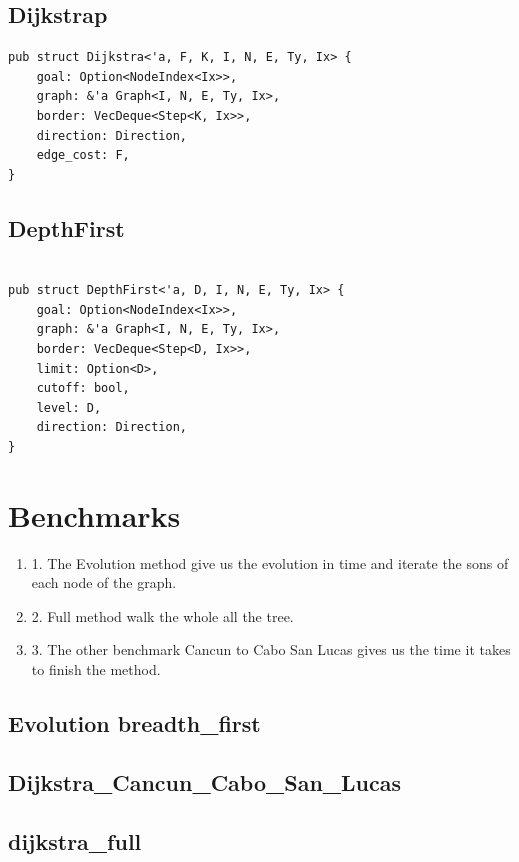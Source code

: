 \subsection{Dijkstrap}
\begin{verbatim}
pub struct Dijkstra<'a, F, K, I, N, E, Ty, Ix> {
    goal: Option<NodeIndex<Ix>>,
    graph: &'a Graph<I, N, E, Ty, Ix>,
    border: VecDeque<Step<K, Ix>>,
    direction: Direction,
    edge_cost: F,
}
\end{verbatim}
\subsection{DepthFirst}
\begin{verbatim}

pub struct DepthFirst<'a, D, I, N, E, Ty, Ix> {
    goal: Option<NodeIndex<Ix>>,
    graph: &'a Graph<I, N, E, Ty, Ix>,
    border: VecDeque<Step<D, Ix>>,
    limit: Option<D>,
    cutoff: bool,
    level: D,
    direction: Direction,
}
\end{verbatim}



\newpage
\section{Benchmarks}

\begin{enumerate}[label={}]
\item 1. The Evolution method give us the evolution in time and iterate the sons of each node of the graph.
\item 2. Full method walk the whole all the tree.
\item 3. The other benchmark Cancun to Cabo San Lucas gives us the time it takes to finish the method.
\end{enumerate}

\subsection{Evolution breadth\_first}

\subsection{Dijkstra\_Cancun\_Cabo\_San\_Lucas}

\subsection{dijkstra\_full}


